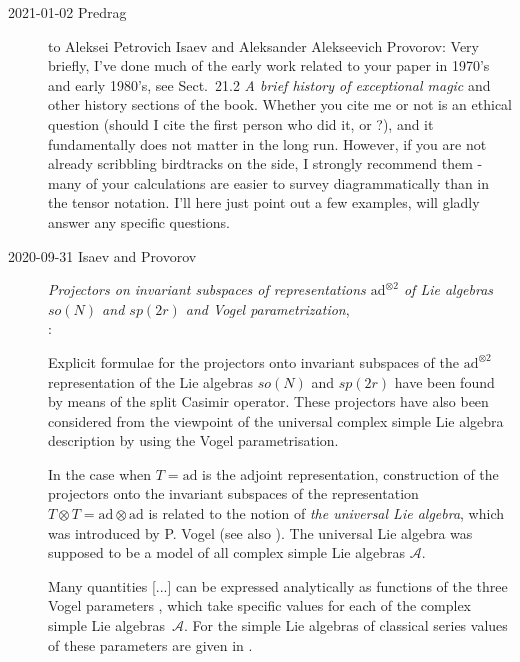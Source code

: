 \begin{description}
\item[2021-01-02 Predrag] to
{Aleksei Petrovich Isaev} and
Aleksander Alekseevich Provorov:
 Very briefly, I've done much of the early work related to
your paper in 1970's and early 1980's, see 
{Sect.~21.2} {\em A brief history of exceptional magic} and other
history sections of the book. Whether you cite me or not is an
ethical question (should I cite
{the first person who did it}, or ?),
and it fundamentally does not matter in the long run.
However, if you are not already scribbling birdtracks on the side, I
strongly recommend them - many of your calculations are easier to survey
diagrammatically than in the tensor notation. I'll here just point out a
few examples, will gladly answer any specific questions.

\item[2020-09-31 Isaev and Provorov]
{\em Projectors on invariant subspaces of representations
{$\mathrm{ad}^{\otimes 2}$} of {Lie} algebras ${so(N)}$ and {$sp(2r)$}
and {Vogel} parametrization},\\
:

Explicit formulae for the projectors onto invariant subspaces of the
$\mathrm{ad}^{\otimes 2}$ representation of the Lie algebras $so(N)$ and $sp(2r)$
have been found by means of the split Casimir operator. These projectors
have also been considered from the viewpoint of the universal complex
simple Lie algebra description by using the Vogel parametrisation.

In the case when $T=\mathrm{ad}$ is the adjoint representation,
construction of the projectors onto the invariant subspaces of the
representation $T\otimes T=\mathrm{ad}\otimes \mathrm{ad}$ is related to
the notion of \textit{the universal Lie algebra}, which was introduced by
P. Vogel (see also ). The universal Lie
algebra was supposed to be a model of all complex simple Lie algebras
$\mathcal{A}$.

Many quantities [...] can be expressed analytically\cite{MkSeVe12} as
functions of the three Vogel parameters \cite{PV99,lands01}, which take
specific values for each of the complex simple Lie
algebras~$\mathcal{A}$. For the simple Lie algebras of classical series
values of these parameters are given in .


\end{description}
